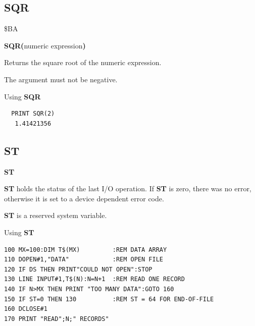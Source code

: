 \subsection{SQR}
\begin{description}[leftmargin=2cm,style=nextline]
\item [Token:] \$BA
\item [Format:] {\bf SQR(}numeric expression{\bf)}
\item [Usage:] Returns the square root of the numeric expression.

\item [Remarks:] The argument must not be negative.
\item [Example:] Using {\bf SQR}
\begin{tcolorbox}[colback=black,coltext=white]
\verbatimfont{\codefont}
\begin{verbatim}
  PRINT SQR(2)
   1.41421356
\end{verbatim}
\end{tcolorbox}
\end{description}


\newpage
\subsection{ST}
\begin{description}[leftmargin=2cm,style=nextline]
\item [Format:] {\bf ST}
\item [Usage:]  {\bf ST} holds the status of the last I/O operation.
                If {\bf ST} is zero, there was no error, otherwise
                it is set to a device dependent error code.
\item[Remarks:] {\bf ST} is a reserved system variable.
\item [Example:] Using {\bf ST}
\begin{tcolorbox}[colback=black,coltext=white]
\verbatimfont{\codefont}
\begin{verbatim}
100 MX=100:DIM T$(MX)         :REM DATA ARRAY
110 DOPEN#1,"DATA"            :REM OPEN FILE
120 IF DS THEN PRINT"COULD NOT OPEN":STOP
130 LINE INPUT#1,T$(N):N=N+1  :REM READ ONE RECORD
140 IF N>MX THEN PRINT "TOO MANY DATA":GOTO 160
150 IF ST=0 THEN 130          :REM ST = 64 FOR END-OF-FILE
160 DCLOSE#1
170 PRINT "READ";N;" RECORDS"
\end{verbatim}
\end{tcolorbox}
\end{description}

